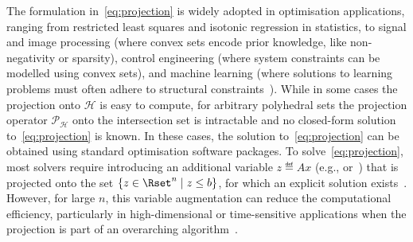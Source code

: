 The formulation in~\eqref{eq:projection} is widely adopted in optimisation applications, ranging from restricted least squares and isotonic regression in statistics, to signal and image processing (where convex sets encode prior knowledge, like non-negativity or sparsity), control engineering (where system constraints can be modelled using convex sets), and machine learning (where solutions to learning problems must often adhere to structural constraints~\cite{BAUSCHKESWISS}). While in some cases the projection onto $\mathcal{H}$ is easy to compute, for arbitrary polyhedral sets the projection operator $\mathcal{P}_{\mathcal{H}}$ onto the intersection set is intractable and no closed-form solution to~\eqref{eq:projection} is known. In these cases, the solution to~\eqref{eq:projection} can be obtained using standard optimisation software packages. To solve~\eqref{eq:projection}, most solvers require introducing an additional variable $z\eqdef Ax$ (e.g., \cite{osqp} or~\cite{ocpb:16}) that is projected onto the set $\set{z\in\Rset^n}{z \leq b}$, for which an explicit solution exists~\cite{BOYDCONVEX}. However, for large $n$, this variable augmentation can reduce the computational efficiency, particularly in high-dimensional or time-sensitive applications when the projection is part of an overarching algorithm~\cite{OPTIMNESTEROV,KEMPF20206542}.



